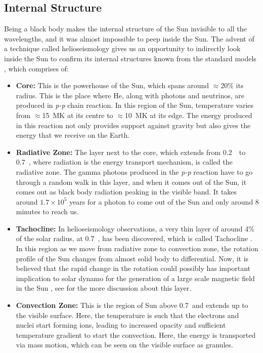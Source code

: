 \subsection{Internal Structure}
Being a black body makes the internal structure of the Sun invisible to all the wavelengths, and it was almost impossible to peep inside the Sun. The advent of a technique called helioseismology \citep{Dalsgaard2002} gives us an opportunity to indirectly look inside the Sun to confirm its internal structures known from the standard models \citep{Stix2012book}, which comprises of: 
\begin{itemize}
    \item {\bf Core:} This is the powerhouse of the Sun, which spans around $\approx$20\% its radius. This is the place where He, along with photons and neutrinos, are produced in {\it p-p} chain reaction. In this region of the Sun, temperature varies from $\approx$15~MK at its centre to $\approx$10~MK at its edge. The energy produced in this reaction not only provides support against gravity but also gives the energy that we receive on the Earth. 
    
    \item {\bf Radiative Zone:} The layer next to the core, which extends from 0.2~\Rsun\ to 0.7~\Rsun, where radiation is the energy transport mechanism, is called the radiative zone. The gamma photons produced in the {\it p-p} reaction have to go through a random walk in this layer, and when it comes out of the Sun, it comes out as black body radiation peaking in the visible band. It takes around $1.7\times 10^5$ years for a photon to come out of the Sun and only around 8 minutes to reach us.
    
    \item {\bf Tachocline:}  In helioseismology observations, a very thin layer of around 4\% of the solar radius, at 0.7~\Rsun, has been discovered, which is called Tachocline \citep{Charbonneau1999}. In this region as we move from radiative zone to convection zone, the rotation profile of the Sun changes from almost solid body to differential. Now, it is believed that the rapid change in the rotation could possibly has important implication to solar dynamo for the generation of a large scale magnetic field in the Sun \citep{Miesch2005}, see  \citet{Wright2016} for the more discussion about this layer.
    
    
    \item {\bf Convection Zone:} This is the region of Sun above 0.7~\Rsun and extends up to the visible surface. Here, the temperature is such that the electrons and nuclei start forming ions, leading to increased opacity and sufficient temperature gradient to start the convection. Here, the energy is transported via mass motion, which can be seen on the visible surface as granules. 
\end{itemize}

